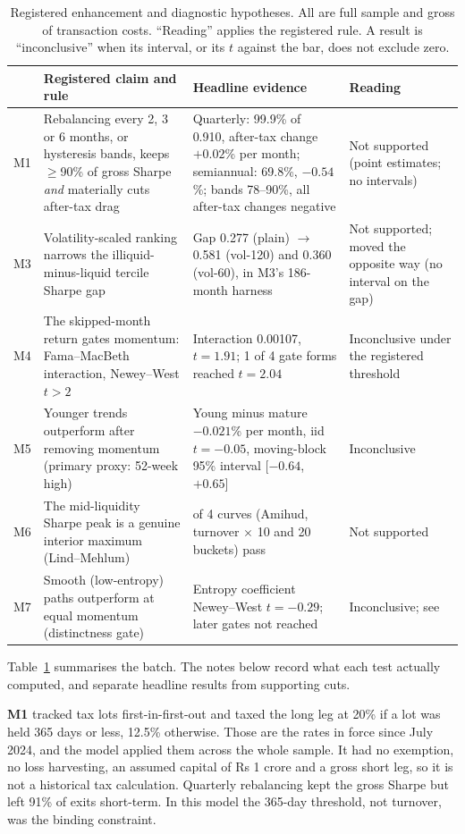 \documentclass[11pt]{article}
\begin{document}
\begin{table}[t]
\centering\footnotesize
\caption{Registered enhancement and diagnostic hypotheses. All are full sample and
gross of transaction costs. ``Reading'' applies the registered rule. A result is
``inconclusive'' when its interval, or its $t$ against the bar, does not exclude zero.}
\label{tab:mbatch}
\begin{tabularx}{\linewidth}{@{}l>{\raggedright\arraybackslash}X>{\raggedright\arraybackslash}X>{\raggedright\arraybackslash}p{2.3cm}@{}}
\toprule
& Registered claim and rule & Headline evidence & Reading \\
\midrule
M1 & Rebalancing every 2, 3 or 6 months, or hysteresis bands, keeps $\geq$90\% of gross Sharpe \emph{and} materially cuts after-tax drag &
Quarterly: 99.9\% of 0.910, after-tax change $+0.02$\% per month; semiannual: 69.8\%, $-0.54$\%; bands 78--90\%, all after-tax changes negative &
Not supported (point estimates; no intervals) \\
M3 & Volatility-scaled ranking narrows the illiquid-minus-liquid tercile Sharpe gap &
Gap 0.277 (plain) $\to$ 0.581 (vol-120) and 0.360 (vol-60), in M3's 186-month harness &
Not supported; moved the opposite way (no interval on the gap) \\
M4 & The skipped-month return gates momentum: Fama--MacBeth interaction, Newey--West $t>2$ &
Interaction 0.00107, $t=1.91$; 1 of 4 gate forms reached $t=2.04$ &
Inconclusive under the registered threshold \\
M5 & Younger trends outperform after removing momentum (primary proxy: 52-week high) &
Young minus mature $-0.021$\% per month, iid $t=-0.05$, moving-block 95\% interval [$-0.64$, $+0.65$] &
Inconclusive \\
M6 & The mid-liquidity Sharpe peak is a genuine interior maximum (Lind--Mehlum) &
0 of 4 curves (Amihud, turnover $\times$ 10 and 20 buckets) pass &
Not supported \\
M7 & Smooth (low-entropy) paths outperform at equal momentum (distinctness gate) &
Entropy coefficient Newey--West $t=-0.29$; later gates not reached &
Inconclusive; see \citet{sahi_pathtexture} \\
\bottomrule
\end{tabularx}
\end{table}

Table~\ref{tab:mbatch} summarises the batch. The notes below record what each test
actually computed, and separate headline results from supporting cuts.

\textbf{M1} tracked tax lots first-in-first-out and taxed the long leg at 20\% if a lot
was held 365 days or less, 12.5\% otherwise. Those are the rates in force since July
2024, and the model applied them across the whole sample. It had no exemption, no loss
harvesting, an assumed capital of Rs 1 crore and a gross short leg, so it is not a
historical tax calculation. Quarterly rebalancing kept the gross Sharpe but left 91\% of
exits short-term. In this model the 365-day threshold, not turnover, was the binding
constraint.
\end{document}
